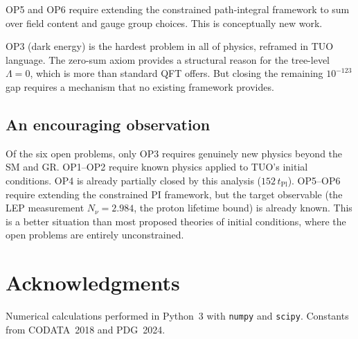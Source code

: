 \documentclass[12pt,a4paper]{article}
\theoremstyle{remark}
\newcommand{\tPl}{t_{\mathrm{Pl}}}
\begin{document}
OP5 and OP6 require extending the constrained path-integral framework
to sum over field content and gauge group choices.
This is conceptually new work.

OP3 (dark energy) is the hardest problem in all of physics, reframed
in TUO language.
The zero-sum axiom provides a structural reason for the tree-level
$\Lambda = 0$, which is more than standard QFT offers.
But closing the remaining $10^{-123}$ gap requires a mechanism that
no existing framework provides.

\subsection{An encouraging observation}

Of the six open problems, only OP3 requires genuinely new physics
beyond the SM and GR.
OP1--OP2 require known physics applied to TUO's initial conditions.
OP4 is already partially closed by this analysis ($152\,\tPl$).
OP5--OP6 require extending the constrained PI framework, but the
target observable (the LEP measurement $N_\nu = 2.984$, the proton
lifetime bound) is already known.
This is a better situation than most proposed theories of initial
conditions, where the open problems are entirely unconstrained.

\section*{Acknowledgments}
Numerical calculations performed in Python~3 with \texttt{numpy} and
\texttt{scipy}.
Constants from CODATA~2018 and PDG~2024.
\end{document}
